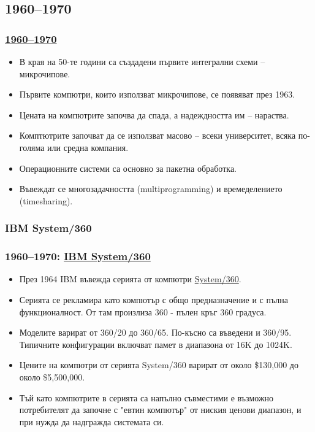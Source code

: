 \documentclass[ignorenonframetext, hyperref=unicode]{beamer}
\begin{document}
\subsection{1960--1970}

\begin{frame}
\frametitle{\href{http://en.wikipedia.org/wiki/History_of_computing_hardware_(1960s-present)}{
1960--1970}}
\begin{itemize}
  \item В края на 50-те години са създадени първите интегрални схеми --
  микрочипове.
  \item Първите компютри, които използват микрочипове, се появяват през 1963.
  \item Цената на компютрите започва да спада, а надеждността им -- нараства.
  \item Комптютрите започват да се използват масово -- всеки университет, всяка
  по-голяма или средна компания.
  \item Операционните системи са основно за пакетна обработка.
  \item Въвеждат се многозадачността (multiprogramming) и времеделението
  (timesharing). 
\end{itemize}
\end{frame}


\subsubsection{IBM System/360}

\begin{frame}
\frametitle{1960--1970: \href{http://en.wikipedia.org/wiki/System/360}{IBM System/360}}
\begin{itemize}
  \item През 1964 IBM въвежда серията от компютри
  \href{http://www-03.ibm.com/ibm/history/exhibits/mainframe/mainframe_PR360.html}{System/360}. 
  \item Серията се рекламира като компютър с общо предназначение и с пълна
  функционалност. От там произлиза 360 - пълен кръг 360 градуса.
  \item Моделите варират от 360/20 до 360/65. По-късно са въведени и 360/95.
  Типичните конфигурации включват памет в диапазона от 16K до 1024K.
  \item  Цените на компютри от серията System/360 варират от около \$130,000
  до около \$5,500,000.
  \item Тъй като компютрите в серията са напълно съвместими е възможно
  потребителят да започне с "евтин компютър" от ниския ценови диапазон, и при
  нужда да надгражда системата си.
\end{itemize}
\end{frame}
  
\end{document}
